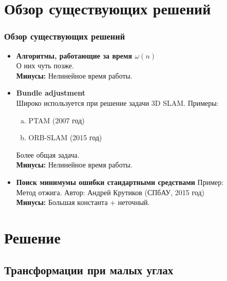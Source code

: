 \documentclass{beamer}
\newenvironment{InnerMyList}[1][0pt]{
	\vspace*{-0.5em}
	\begin{enumerate}[a)]
		\setlength{\parskip}{#1}
		\setlength{\itemsep}{0pt}
	}{
\end{enumerate}
}
\begin{document}
\section{Обзор существующих решений}

\begin{frame}
\frametitle{Обзор существующих решений}
	\begin{itemize}	
	\item{\bf Алгоритмы, работающие за время $\omega(n)$ }\\
	О них чуть позже.\\
	\textbf{Минусы:} Нелинейное время работы.
		
	\item{\bf Bundle adjustment}\\
	Широко используется при решение задачи 3D SLAM. Примеры:\\
	\begin{InnerMyList}
		\item
		PTAM (2007 год)
		
		\item
		ORB-SLAM (2015 год)
	\end{InnerMyList}
	 Более общая задача.\\
	 \textbf{Минусы:} Нелинейное время работы.

	\item{\bf Поиск минимумы ошибки стандартными средствами}
	Пример:\\
	Метод отжига. Автор: Андрей Крутиков (СПбАУ, 2015 год)\\
	\textbf{Минусы:} Большая константа + неточный.
\end{itemize}
\end{frame}

\section{Решение}
\subsection{Трансформации при малых углах}
\end{document}
